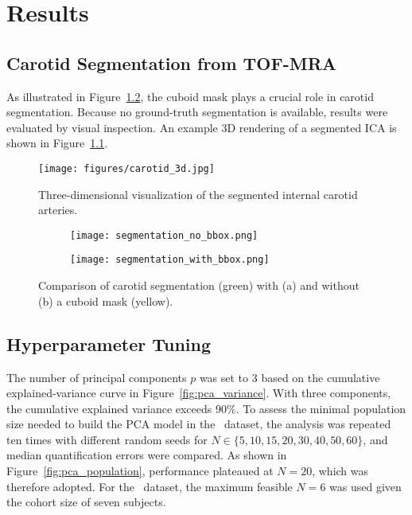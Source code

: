\chapter{Results}

\section{Carotid Segmentation from TOF-MRA}
As illustrated in Figure~\ref{fig:seg_compare}, the cuboid mask plays a crucial role in carotid segmentation.
Because no ground-truth segmentation is available, results were evaluated by visual inspection.
An example 3D rendering of a segmented ICA is shown in Figure~\ref{fig:carotid_3d}.

\begin{figure}[h]
	\centering
	\texttt{[image: figures/carotid\_3d.jpg]}
	\caption{Three-dimensional visualization of the segmented internal carotid arteries.}
	\label{fig:carotid_3d}
\end{figure}

\begin{figure}[h]
	\centering
	\begin{subfigure}{0.45\textwidth}
		\texttt{[image: segmentation\_no\_bbox.png]}
		\caption{}
	\end{subfigure}
	\begin{subfigure}{0.45\textwidth}
		\texttt{[image: segmentation\_with\_bbox.png]}
		\caption{}
	\end{subfigure}
	\caption{Comparison of carotid segmentation (green) with (a) and without (b) a cuboid mask (yellow).}
	\label{fig:seg_compare}
\end{figure}

\section{Hyperparameter Tuning}
The number of principal components \(p\) was set to 3 based on the cumulative explained-variance curve in Figure~\ref{fig:pca_variance}.
With three components, the cumulative explained variance exceeds 90\%.
To assess the minimal population size needed to build the PCA model in the \fdg\ dataset, the analysis was repeated ten times with different random seeds for \(N\in\{5,10,15,20,30,40,50,60\}\), and median quantification errors were compared.
As shown in Figure~\ref{fig:pca_population}, performance plateaued at \(N=20\), which was therefore adopted.
For the \yohimbine\ dataset, the maximum feasible \(N=6\) was used given the cohort size of seven subjects.

